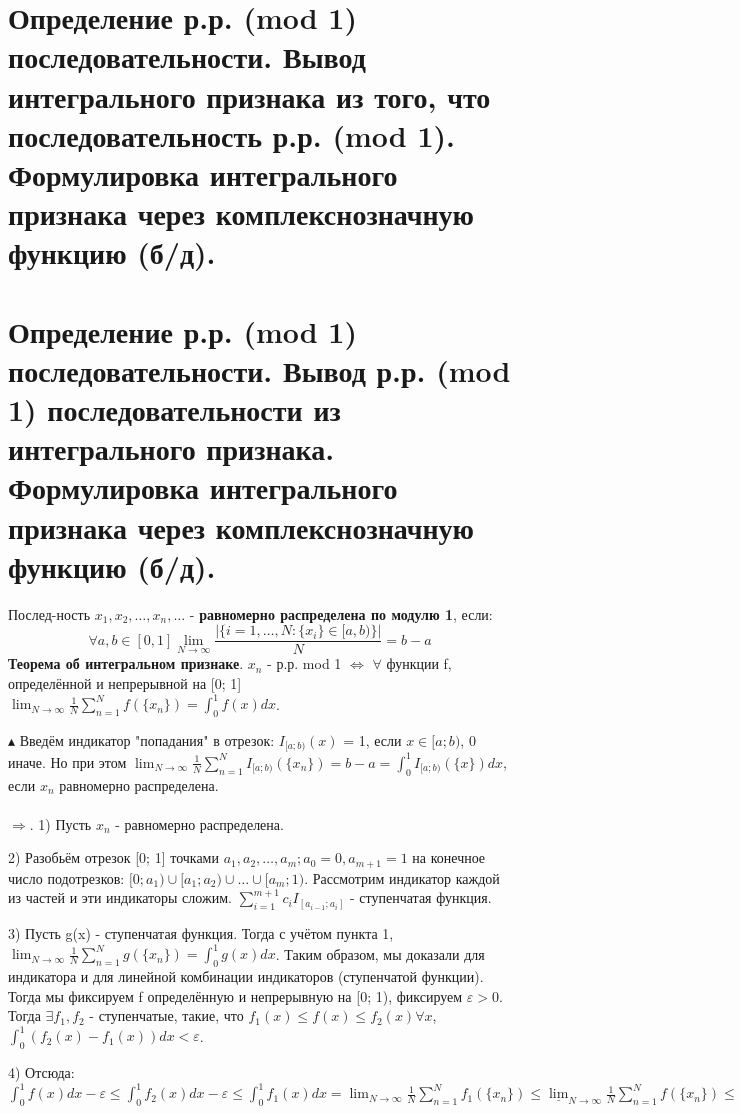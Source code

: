 \setcounter{section}{77}
\section{Определение р.р. (mod 1) последовательности. Вывод интегрального признака из того, что последовательность р.р. (mod 1). Формулировка интегрального признака через комплекснозначную функцию (б/д).}


\section{Определение р.р. (mod 1) последовательности. Вывод р.р. (mod 1) последовательности из интегрального признака. Формулировка интегрального признака через комплекснозначную функцию (б/д).}
Послед-ность $x_1, x_2, \dots, x_n, \dots$ - \textbf{равномерно распределена по модулю 1}, если:
\[ \forall a, b \in [0, 1] \lim_{N \to \infty} \frac{|\{i = 1, \dots, N: \{x_i\} \in [a, b)\}|}{N} = b - a \]
\textbf{Теорема об интегральном признаке}. $x_n$ - р.р. mod 1 $\Leftrightarrow$ $\forall$ функции f, определённой и непрерывной на [0; 1] $\lim_{N \to \infty} \frac{1}{N} \sum_{n=1}^N f(\{x_n\}) = \int_{0}^{1} f(x)dx$. \par
$\blacktriangle$
Введём индикатор "попадания" в отрезок: $I_{[a; b)}(x)$ = 1, если $x \in [a; b)$, 0 иначе. Но при этом $\lim_{N \to \infty} \frac{1}{N} \sum_{n=1}^N I_{[a; b)}(\{x_n\}) = b - a = \int_{0}^{1} I_{[a; b)}(\{x\}) dx $, если $x_n$ равномерно распределена. \\
\\
$\Rightarrow$. 1) Пусть $x_n$ - равномерно распределена. \par
2) Разобьём отрезок [0; 1] точками $a_1, a_2, \dots, a_m; a_0 = 0, a_{m+1} = 1$ на конечное число подотрезков:
$[0; a_1) \cup [a_1; a_2) \cup \dots \cup [a_m; 1)$. Рассмотрим индикатор каждой из частей и эти индикаторы сложим. $\sum_{i=1}^{m+1} c_i I_{[a_{i-1}; a_i]}$ - ступенчатая функция. \par
3) Пусть g(x) - ступенчатая функция. Тогда с учётом пункта 1, $\lim_{N \to \infty} \frac{1}{N} \sum_{n=1}^N g(\{x_n\}) = \int_0^1 g(x)dx$. Таким образом, мы доказали для индикатора и для линейной комбинации индикаторов (ступенчатой функции). Тогда мы фиксируем f определённую и непрерывную на [0; 1), фиксируем $\varepsilon > 0$. Тогда $\exists f_1, f_2$ - ступенчатые, такие, что $f_1(x) \leqslant f(x) \leqslant f_2(x) \forall x$, $\int_0^1 (f_2(x) - f_1(x))dx < \varepsilon$.  \par
4) Отсюда: $\int_0^1 f(x)dx - \varepsilon \leqslant \int_0^1f_2(x)dx - \varepsilon \leqslant \int_0^1 f_1(x)dx = \lim_{N \to \infty} \frac{1}{N} \sum_{n=1}^N f_1(\{x_n\}) \leqslant \underline\lim_{N \to \infty} \frac{1}{N} \sum_{n=1}^N f(\{x_n\}) \leqslant \overline\lim_{N \to \infty} \frac{1}{N} \sum_{n=1}^N f(\{x_n\}) \leqslant$ \\ 
